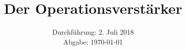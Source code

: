 

\subject{V51}
\title{Der Operationsverstärker}
\date{%
  Durchführung: 2. Juli 2018
  \\
  Abgabe: \today
}



\maketitle
\thispagestyle{empty}
\tableofcontents
\newpage






\printbibliography{}
\newpage



